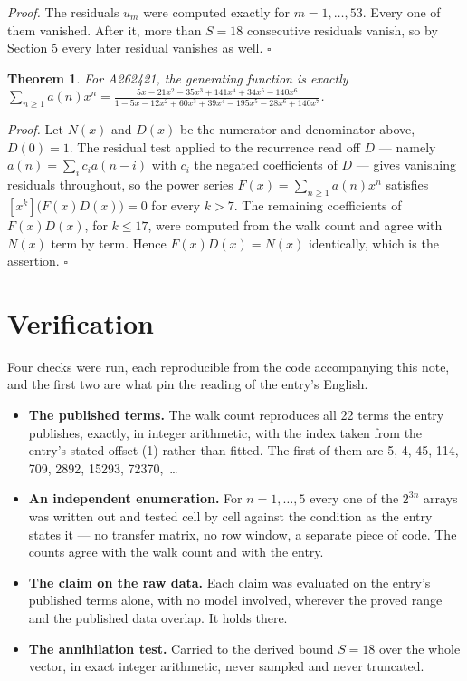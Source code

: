 \documentclass[11pt]{article}
\newtheorem{theorem}{Theorem}
\theoremstyle{definition}
\begin{document}
{\itshape Proof.} The residuals $u_m$ were computed exactly for $m = 1,\dots,53$. Every one of them vanished. After it, more than $S = 18$ consecutive residuals vanish, so by Section 5 every later residual vanishes as well. $\square$

\begin{theorem} For A262421, the generating function is exactly $\sum_{n\ge 1} a(n)x^n = \frac{5x - 21x^{2} - 35x^{3} + 141x^{4} + 34x^{5} - 140x^{6}}{1 - 5x - 12x^{2} + 60x^{3} + 39x^{4} - 195x^{5} - 28x^{6} + 140x^{7}}$.\end{theorem}

{\itshape Proof.} Let $N(x)$ and $D(x)$ be the numerator and denominator above, $D(0)=1$. The residual test applied to the recurrence read off $D$ --- namely $a(n) = \sum_i c_i a(n-i)$ with $c_i$ the negated coefficients of $D$ --- gives vanishing residuals throughout, so the power series $F(x)=\sum_{n\ge 1}a(n)x^n$ satisfies $[x^k]\bigl(F(x)D(x)\bigr) = 0$ for every $k > 7$. The remaining coefficients of $F(x)D(x)$, for $k \le 17$, were computed from the walk count and agree with $N(x)$ term by term. Hence $F(x)D(x) = N(x)$ identically, which is the assertion. $\square$

\section{Verification}

Four checks were run, each reproducible from the code accompanying this note, and the first two are what pin the reading of the entry's English.

\begin{itemize}

\item {\bfseries The published terms.} The walk count reproduces all 22 terms the entry publishes, exactly, in integer arithmetic, with the index taken from the entry's stated offset (1) rather than fitted. The first of them are 5, 4, 45, 114, 709, 2892, 15293, 72370,~\dots

\item {\bfseries An independent enumeration.} For $n = 1,\dots,5$ every one of the $2^{3n}$ arrays was written out and tested cell by cell against the condition as the entry states it --- no transfer matrix, no row window, a separate piece of code. The counts agree with the walk count and with the entry.

\item {\bfseries The claim on the raw data.} Each claim was evaluated on the entry's published terms alone, with no model involved, wherever the proved range and the published data overlap. It holds there.

\item {\bfseries The annihilation test.} Carried to the derived bound $S = 18$ over the whole vector, in exact integer arithmetic, never sampled and never truncated.

\end{itemize}
\end{document}
